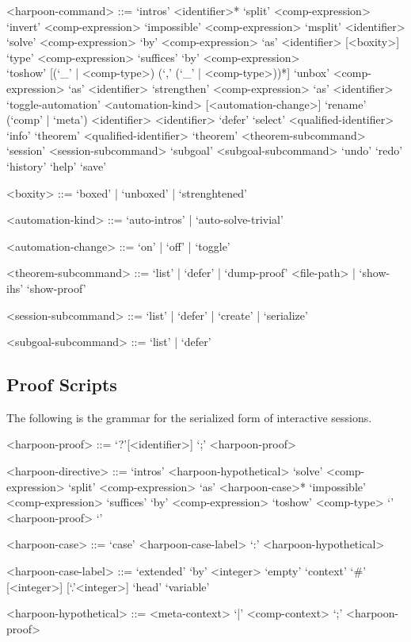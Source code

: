 \begin{grammar}
<harpoon-command> ::= `intros' <identifier>*
\alt `split' <comp-expression>
\alt `invert' <comp-expression>
\alt `impossible' <comp-expression>
\alt `msplit' <identifier>
\alt `solve' <comp-expression>
\alt `by' <comp-expression> `as' <identifier> [<boxity>]
\alt `type' <comp-expression>
\alt `suffices' `by' <comp-expression>\\
`toshow' [(`_' | <comp-type>) (`,' (`_' | <comp-type>))*]
\alt `unbox' <comp-expression> `as' <identifier>
\alt `strengthen' <comp-expression> `as' <identifier>
\alt `toggle-automation' <automation-kind> [<automation-change>]
\alt `rename' (`comp' | `meta') <identifier> <identifier>
\alt `defer'
\alt `select' <qualified-identifier>
\alt `info' `theorem' <qualified-identifier>
\alt `theorem' <theorem-subcommand>
\alt `session' <session-subcommand>
\alt `subgoal' <subgoal-subcommand>
\alt `undo'
\alt `redo'
\alt `history'
\alt `help'
\alt `save'

<boxity> ::= `boxed' | `unboxed' | `strenghtened'

<automation-kind> ::= `auto-intros' | `auto-solve-trivial'

<automation-change> ::= `on' | `off' | `toggle'

<theorem-subcommand> ::= `list' | `defer' | `dump-proof' <file-path> | `show-ihs' \alt `show-proof'

<session-subcommand> ::= `list' | `defer' | `create' | `serialize'

<subgoal-subcommand> ::= `list' | `defer'
\end{grammar}

\subsection{\Harpoon Proof Scripts}\label{section:syntax-harpoon-proof-scripts}

The following is the grammar for the serialized form of \Harpoon interactive sessions.

\begin{grammar}
<harpoon-proof> ::= `?'[<identifier>]
 `;' <harpoon-proof>

<harpoon-directive> ::= `intros' <harpoon-hypothetical>
\alt `solve' <comp-expression>
\alt `split' <comp-expression> `as' <harpoon-case>*
\alt `impossible' <comp-expression>
\alt `suffices' `by' <comp-expression> `toshow' <comp-type> `{' <harpoon-proof> `}'

<harpoon-case> ::= `case' <harpoon-case-label> `:' <harpoon-hypothetical>

<harpoon-case-label> ::= `extended' `by' <integer>
\alt `empty' `context'
\alt `#' [<integer>] [`.'<integer>]
\alt `head' `variable'

<harpoon-hypothetical> ::= <meta-context> `|' <comp-context> `;' <harpoon-proof>
\end{grammar}

